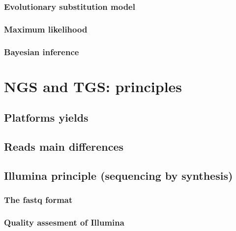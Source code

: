 \documentclass[
  letterpaper,
  DIV=11,
  numbers=noendperiod,
  oneside]{scrreprt}
\begin{document}
\hypertarget{evolutionary-substitution-model}{%
\subsection{Evolutionary substitution
model}\label{evolutionary-substitution-model}}

\hypertarget{maximum-likelihood}{%
\subsection{Maximum likelihood}\label{maximum-likelihood}}

\hypertarget{bayesian-inference}{%
\subsection{Bayesian inference}\label{bayesian-inference}}

\hypertarget{sec-ngs-tgs}{%
\chapter{NGS and TGS: principles}\label{sec-ngs-tgs}}

\hypertarget{platforms-yields}{%
\section{Platforms yields}\label{platforms-yields}}

\hypertarget{reads-main-differences}{%
\section{Reads main differences}\label{reads-main-differences}}

\hypertarget{illumina-principle-sequencing-by-synthesis}{%
\section{Illumina principle (sequencing by
synthesis)}\label{illumina-principle-sequencing-by-synthesis}}

\hypertarget{the-fastq-format}{%
\subsection{The fastq format}\label{the-fastq-format}}

\hypertarget{quality-assesment-of-illumina}{%
\subsection{Quality assesment of
Illumina}\label{quality-assesment-of-illumina}}
\end{document}

